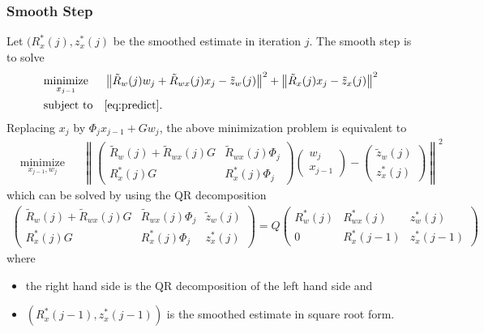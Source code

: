 \documentclass[microtype]{gtpart}     %
\theoremstyle{definition}
\newcommand{\norm}[1]{\left\lVert#1\right\rVert}
\begin{document}
\subsubsection{Smooth Step}

Let $(R^*_x(j), z^*_x(j)$ be the smoothed estimate in iteration $j$.
The smooth step is to solve
\begin{align*}
	& \underset{x_{j-1}}{\text{minimize}} & &\norm{\tilde{R}_w(j)w_j + \tilde{R}_{wx}(j)x_j - \tilde{z}_w(j)}^2 +
	\norm{\tilde{R}_x(j)x_j - \tilde{z}_x(j)}^2 \\
	& \text{subject to} & & \autoref{eq:predict}.
\end{align*}
Replacing $x_j$ by $\Phi_j x_{j-1} + Gw_j$, the above minimization problem is equivalent to
\begin{align*}
	& \underset{x_{j-1}, w_j}{\text{minimize}} & &\norm{
		\begin{pmatrix}
			\tilde{R}_w(j) + \tilde{R}_{wx}(j)G &\tilde{R}_{wx}(j)\Phi_j \\
			R^*_x(j)G &R^*_x(j)\Phi_j
		\end{pmatrix}
		\begin{pmatrix}
		w_j \\ x_{j-1}
		\end{pmatrix} - 
		\begin{pmatrix}
			\tilde{z}_w(j) \\ z^*_x(j)
		\end{pmatrix}}^2
\end{align*}
which can be solved by using the QR decomposition
\begin{align*}
	\begin{pmatrix}
		\tilde{R}_w(j) + \tilde{R}_{wx}(j)G &\tilde{R}_{wx}(j)\Phi_j &\tilde{z}_w(j) \\
		R^*_x(j)G &R^*_x(j)\Phi_j &z^*_x(j)
	\end{pmatrix} = Q
	\begin{pmatrix}
		R^*_w(j) &R^*_{wx}(j) &z^*_w(j) \\
		0 &R^*_x(j-1) &z^*_x(j-1)
	\end{pmatrix}
\end{align*}
where
\begin{itemize}
	\item the right hand side is the QR decomposition of the left hand side and
	\item $(R^*_x(j-1), z^*_x(j-1))$ is the smoothed estimate in square root form.
\end{itemize}


%
%
%


%


\end{document}
